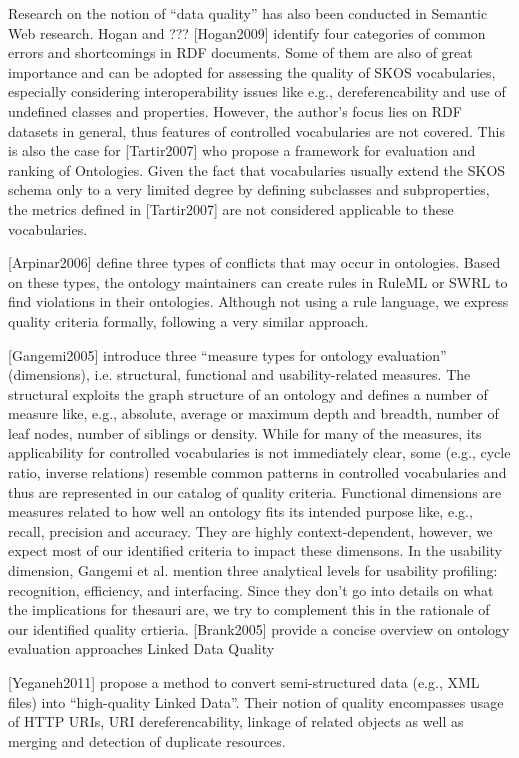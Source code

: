 Research on the notion of “data quality” has also been conducted in Semantic Web research. Hogan and ??? [Hogan2009] identify four categories of common errors and shortcomings in RDF documents. Some of them are also of great importance and can be adopted for assessing the quality of SKOS vocabularies, especially considering interoperability issues like e.g., dereferencability and use of undefined classes and properties. However, the author’s focus lies on RDF datasets in general, thus features of controlled vocabularies are not covered. This is also the case for [Tartir2007] who propose a framework for evaluation and ranking of Ontologies. Given the fact that vocabularies usually extend the SKOS schema only to a very limited degree by defining subclasses and subproperties, the metrics defined in [Tartir2007] are not considered applicable to these vocabularies.

[Arpinar2006] define three types of conflicts that may occur in ontologies. Based on these types, the ontology maintainers can create rules in RuleML or SWRL to find violations in their ontologies. Although not using a rule language, we express quality criteria formally, following a very similar approach.

[Gangemi2005] introduce three “measure types for ontology evaluation” (dimensions), i.e. structural, functional and usability-related measures. The structural exploits the graph structure of an ontology and defines a number of measure like, e.g., absolute, average or maximum depth and breadth, number of leaf nodes, number of siblings or density. While for many of the measures, its applicability for controlled vocabularies is not immediately clear, some (e.g., cycle ratio, inverse relations) resemble common patterns in controlled vocabularies and thus are represented in our catalog of quality criteria. Functional dimensions are measures related to how well an ontology fits its intended purpose like, e.g., recall, precision and accuracy. They are highly context-dependent, however, we expect most of our identified criteria to impact these dimensons. In the usability dimension, Gangemi et al. mention three analytical levels for usability profiling: recognition, efficiency, and interfacing. Since they don’t go into details on what the implications for thesauri are, we try to complement this in the rationale of our identified quality crtieria. [Brank2005] provide a concise overview on ontology evaluation approaches
Linked Data Quality

[Yeganeh2011] propose a method to convert semi-structured data (e.g., XML files) into “high-quality Linked Data”. Their notion of quality encompasses usage of HTTP URIs, URI dereferencability, linkage of related objects as well as merging and detection of duplicate resources.
